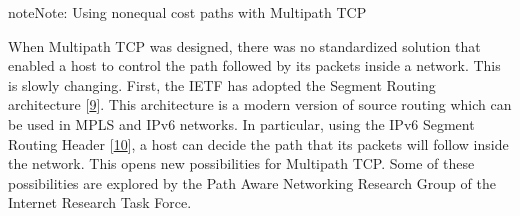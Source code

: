\documentclass[letterpaper,10pt,english]{sphinxmanual}
\begin{document}
\begin{sphinxadmonition}{note}{Note:}
\sphinxAtStartPar
Using non\sphinxhyphen{}equal cost paths with Multipath TCP

\sphinxAtStartPar
When Multipath TCP was designed, there was no standardized solution that enabled a host to control the path followed by its packets inside a network. This is slowly changing. First, the IETF has adopted the Segment Routing architecture {[}\hyperlink{cite.biblio:id8227}{9}{]}. This architecture is a modern version of source routing which can be used in MPLS and IPv6 networks. In particular, using the IPv6 Segment Routing Header {[}\hyperlink{cite.biblio:id8570}{10}{]}, a host can decide the path that its packets will follow inside the network. This opens new possibilities for Multipath TCP. Some of these possibilities are explored by the Path Aware Networking Research Group of the Internet Research Task Force.
\end{sphinxadmonition}
\end{document}
